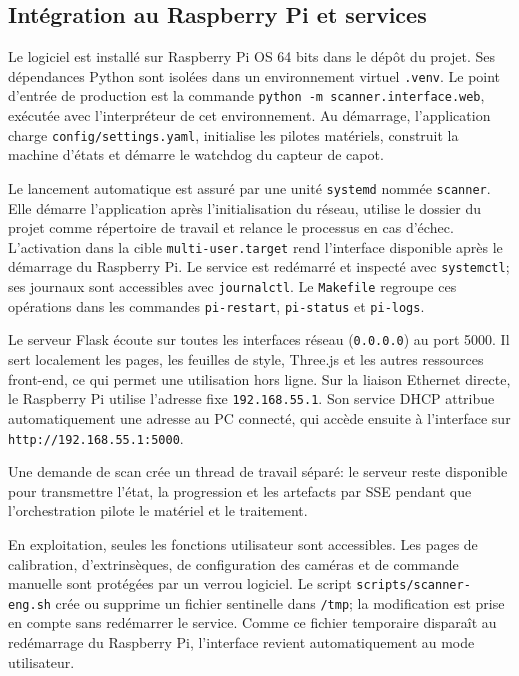 \subsection{Intégration au Raspberry Pi et services}

Le logiciel est installé sur Raspberry Pi OS 64 bits dans le dépôt du projet.
Ses dépendances Python sont isolées dans un environnement virtuel
\texttt{.venv}. Le point d'entrée de production est la commande
\texttt{python -m scanner.interface.web}, exécutée avec l'interpréteur de cet
environnement. Au démarrage, l'application charge
\texttt{config/settings.yaml}, initialise les pilotes matériels, construit la
machine d'états et démarre le watchdog du capteur de capot.

Le lancement automatique est assuré par une unité \texttt{systemd} nommée
\texttt{scanner}. Elle démarre l'application après l'initialisation du réseau,
utilise le dossier du projet comme répertoire de travail et relance le
processus en cas d'échec. L'activation dans la cible
\texttt{multi-user.target} rend l'interface disponible après le démarrage du
Raspberry Pi. Le service est redémarré et inspecté avec \texttt{systemctl};
ses journaux sont accessibles avec \texttt{journalctl}. Le \texttt{Makefile}
regroupe ces opérations dans les commandes \texttt{pi-restart},
\texttt{pi-status} et \texttt{pi-logs}.

Le serveur Flask écoute sur toutes les interfaces réseau
(\texttt{0.0.0.0}) au port 5000. Il sert localement les pages, les feuilles de
style, Three.js et les autres ressources front-end, ce qui permet une
utilisation hors ligne. Sur la liaison Ethernet directe, le Raspberry Pi
utilise l'adresse fixe \texttt{192.168.55.1}. Son service DHCP attribue
automatiquement une adresse au PC connecté, qui accède ensuite à l'interface
sur \texttt{http://192.168.55.1:5000}.

Une demande de scan crée un thread de travail séparé: le serveur reste
disponible pour transmettre l'état, la progression et les artefacts par SSE
pendant que l'orchestration pilote le matériel et le traitement.

En exploitation, seules les fonctions utilisateur sont accessibles. Les pages
de calibration, d'extrinsèques, de configuration des caméras et de commande
manuelle sont protégées par un verrou logiciel. Le script
\texttt{scripts/scanner-eng.sh} crée ou supprime un fichier sentinelle dans
\texttt{/tmp}; la modification est prise en compte sans redémarrer le service.
Comme ce fichier temporaire disparaît au redémarrage du Raspberry Pi,
l'interface revient automatiquement au mode utilisateur.

